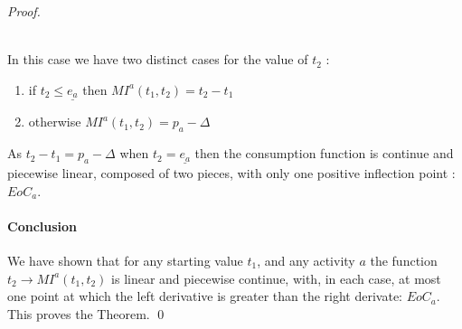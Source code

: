 \documentclass{llncs}
\newcommand \MI[3]{MI^{#3}(#1,#2) }
\newcommand \DOI[1]{EoC_{#1}}
\begin{document}
{\begin{proof}
\begin{minipage}{0.45\textwidth}
\label{Fig:case4}
\end{minipage}\\
\noindent In this case we have two distinct  cases for the value of $t_2$ :
\begin{enumerate}
\item if $t_2 \le \underline{e_a}$  then $\MI{t_1}{t_2}{a}=t_2-t_1$
\item otherwise $\MI{t_1}{t_2}{a} = p_a-\Delta$
\end{enumerate}
As $t_2-t_1 = p_a-\Delta$ when $t_2 = \underline{e_a}$ then the consumption function is continue and piecewise linear,
composed of two pieces, with only one positive inflection point : $\DOI{a}$. \paragraph{Conclusion}
We have shown that for any starting value $t_1$, and any activity $a$  the function $t_2 \rightarrow \MI{t_1}{t_2}{a}$ is linear and piecewise continue,
with, in each case, at most one point at which the left  derivative is greater than the right derivate: $\DOI{a}$. This proves the Theorem.  \qed
\end{proof}
}
\end{document}
